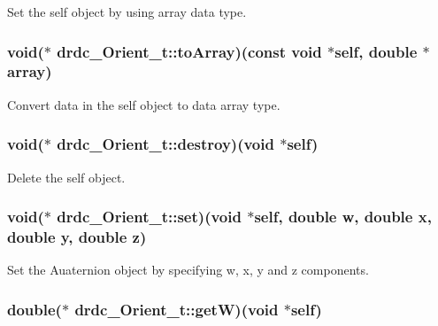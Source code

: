 Set the self object by using array data type. 

\hypertarget{structdrdc__Orient__t_743034467ae09dc406254e1a2ead4831}{
\subsubsection[toArray]{\setlength{\rightskip}{0pt plus 5cm}void($\ast$ {\bf drdc\_\-Orient\_\-t::toArray})(const void $\ast$self, double $\ast$array)}}
\label{structdrdc__Orient__t_743034467ae09dc406254e1a2ead4831}


Convert data in the self object to data array type. 

\hypertarget{structdrdc__Orient__t_63ca59a43edbdfc554318bf802830277}{
\subsubsection[destroy]{\setlength{\rightskip}{0pt plus 5cm}void($\ast$ {\bf drdc\_\-Orient\_\-t::destroy})(void $\ast$self)}}
\label{structdrdc__Orient__t_63ca59a43edbdfc554318bf802830277}


Delete the self object. 

\hypertarget{structdrdc__Orient__t_eda80d52d1eef8480b02e38c1b2079c8}{
\subsubsection[set]{\setlength{\rightskip}{0pt plus 5cm}void($\ast$ {\bf drdc\_\-Orient\_\-t::set})(void $\ast$self, double w, double x, double y, double z)}}
\label{structdrdc__Orient__t_eda80d52d1eef8480b02e38c1b2079c8}


Set the Auaternion object by specifying w, x, y and z components. 

\hypertarget{structdrdc__Orient__t_05db22caf07cfd2672fcc6daef167ad7}{
\subsubsection[getW]{\setlength{\rightskip}{0pt plus 5cm}double($\ast$ {\bf drdc\_\-Orient\_\-t::getW})(void $\ast$self)}}
\label{structdrdc__Orient__t_05db22caf07cfd2672fcc6daef167ad7}


